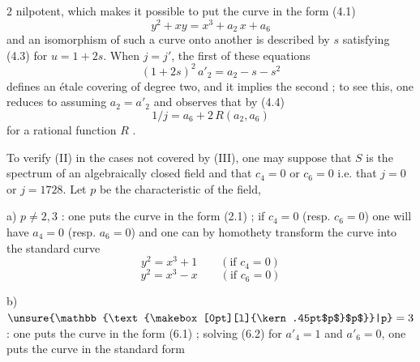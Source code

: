 %
\space
$2$ nilpotent, which makes it possible to put the curve in the form (4.1)
\[
y^2+xy=x^3+a_2\,x+a_6
\]
and an isomorphism of such a curve onto another is described by $s$ satisfying (4.3) for $u=1+2s$. When $j=j'$, the first of these equations
\[
(1+2s)^2\,a'_2=a_2-s-s^2
\]
defines an étale covering of degree two, and it implies the second ; to see this, one reduces to assuming $a_2=a'_2$ and observes that by (4.4)
\[
1/j=a_6+2\,R(a_2,a_6)
\]
for a rational function $R$ .

To verify (II) in the cases not covered by (III), one may suppose that $S$ is the spectrum of an algebraically closed field and that $c_4=0$ or $c_6=0$  i.e. that $j=0$ or $j=1728$. Let $p$ be the characteristic of the field,

a) $p\ne 2,3$ : one puts the curve in the form (2.1) ; if $c_4=0$ (resp. $c_6=0$) one will have $a_4=0$ (resp. $a_6=0$) and one can by homothety transform the curve into the standard curve
\[
y^2=x^3+1 \qquad (\text{if }c_4=0) \tag*{(6.5)}
\]
\[
y^2=x^3-x \qquad (\text{if }c_6=0) \tag*{(6.6)}
\]

b) $\unsure{\mathbb{\text{\makebox[0pt][l]{\kern.45pt$p$}$p$}}|p}=3$ : one puts the curve in the form (6.1) ; solving (6.2) for $a'_4=1$ and $a'_6=0$, one puts the curve in the standard form%

